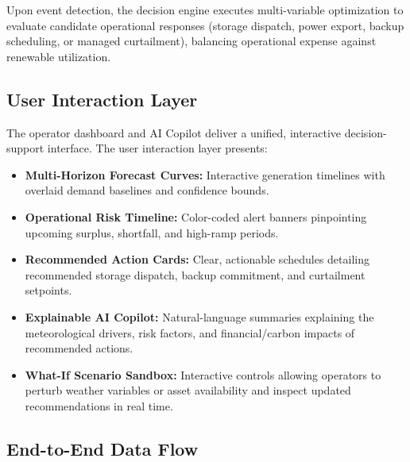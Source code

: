 Upon event detection, the decision engine executes multi-variable optimization to evaluate candidate operational responses (storage dispatch, power export, backup scheduling, or managed curtailment), balancing operational expense against renewable utilization.

\subsection{User Interaction Layer}
\label{subsec:user_interaction}

The operator dashboard and AI Copilot deliver a unified, interactive decision-support interface. The user interaction layer presents:
\begin{itemize}[leftmargin=1.8em, itemsep=0.2em]
    \item \textbf{Multi-Horizon Forecast Curves:} Interactive generation timelines with overlaid demand baselines and confidence bounds.
    \item \textbf{Operational Risk Timeline:} Color-coded alert banners pinpointing upcoming surplus, shortfall, and high-ramp periods.
    \item \textbf{Recommended Action Cards:} Clear, actionable schedules detailing recommended storage dispatch, backup commitment, and curtailment setpoints.
    \item \textbf{Explainable AI Copilot:} Natural-language summaries explaining the meteorological drivers, risk factors, and financial/carbon impacts of recommended actions.
    \item \textbf{What-If Scenario Sandbox:} Interactive controls allowing operators to perturb weather variables or asset availability and inspect updated recommendations in real time.
\end{itemize}

\subsection{End-to-End Data Flow}
\label{subsec:end_to_end_flow}

